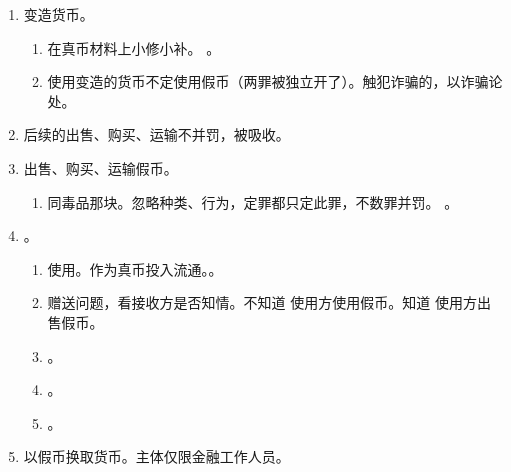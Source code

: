 \begin{enumerate}
\begin{enumerate}
\begin{enumerate}
\begin{enumerate}
                          \item 货币。正在流通的境内外货币。。
                          \item 使用伪造的货币定使用假币。
                        \end{enumerate}
                  \item 变造货币。
                        \begin{enumerate}
                          \item 在真币材料上小修小补。
                                。
                          \item 使用变造的货币不定使用假币（\sjt 两罪被独立开了）。触犯诈骗的，以诈骗论处。
                        \end{enumerate}
                  \item \sjt 后续的出售、购买、运输不并罚，被吸收。
                  \item 出售、购买、运输假币。
                        \begin{enumerate}
                          \item 同毒品那块。忽略种类、行为，定罪都只定此罪，不数罪并罚。
                                。
                        \end{enumerate}
                  \item {}。
                        \begin{enumerate}
                          \item 使用。作为真币投入流通。。
                          \item 赠送问题，看接收方是否知情。\yi 不知道 \yjt 使用方使用假币。\er 知道 \yjt 使用方出售假币。
                          \item {}。
                          \item {}。
                          \item {}。
                        \end{enumerate}
                  \item 以假币换取货币。主体仅限金融工作人员。

\end{enumerate}
\end{enumerate}
\end{enumerate}
